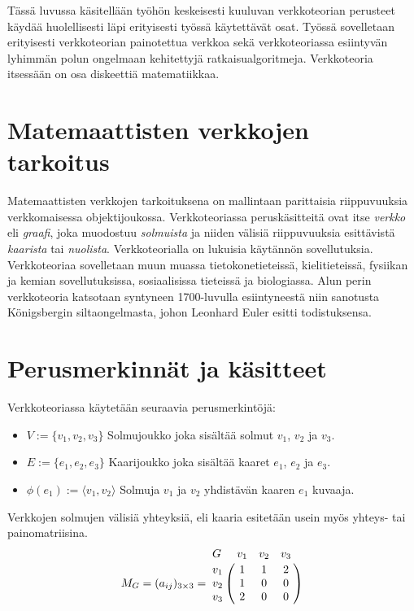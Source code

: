 Tässä luvussa käsitellään työhön keskeisesti kuuluvan verkkoteorian perusteet käydää huolellisesti läpi erityisesti työssä käytettävät osat.
Työssä sovelletaan erityisesti verkkoteorian painotettua verkkoa sekä verkkoteoriassa esiintyvän lyhimmän polun ongelmaan kehitettyjä ratkaisualgoritmeja.
Verkkoteoria itsessään on osa diskeettiä matematiikkaa.

\section{Matemaattisten verkkojen tarkoitus}

Matemaattisten verkkojen tarkoituksena on mallintaan parittaisia riippuvuuksia verkkomaisessa objektijoukossa.
Verkkoteoriassa peruskäsitteitä ovat itse \textit{verkko} eli \textit{graafi}, joka muodostuu \textit{solmuista} ja niiden välisiä riippuvuuksia esittävistä \textit{kaarista} tai \textit{nuolista}.
Verkkoteorialla on lukuisia käytännön sovellutuksia. Verkkoteoriaa sovelletaan muun muassa tietokonetieteissä, kielitieteissä, fysiikan ja kemian sovellutuksissa, sosiaalisissa tieteissä ja biologiassa.
Alun perin verkkoteoria katsotaan syntyneen 1700-luvulla esiintyneestä niin sanotusta Königsbergin siltaongelmasta, johon Leonhard Euler esitti todistuksensa.

\section{Perusmerkinnät ja käsitteet}

Verkkoteoriassa käytetään seuraavia perusmerkintöjä:
\begin{itemize}
  \item \(V := \{v_1, v_2, v_3\}\) Solmujoukko joka sisältää solmut \(v_1\), \(v_2\) ja \(v_3\).
  \item \(E := \{e_1, e_2, e_3\}\) Kaarijoukko joka sisältää kaaret \(e_1\), \(e_2\) ja \(e_3\).
  \item \(\phi(e_1) := \langle v_1, v_2 \rangle\) Solmuja \(v_1\) ja \(v_2\) yhdistävän kaaren \(e_1\) kuvaaja.
\end{itemize}

Verkkojen solmujen välisiä yhteyksiä, eli kaaria esitetään usein myös yhteys- tai painomatriisina.
\[
  M_G = (a_{ij})_{3\times3} =
  \bordermatrix{
    G & v_1 & v_2 & v_3 \cr
    v_1 & 1 & 1 & 2 \cr
    v_2 & 1 & 0 & 0 \cr
    v_3 & 2 & 0 & 0 \cr
  }
\]

